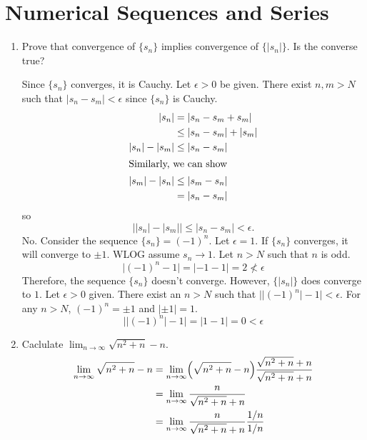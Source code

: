 \chapter{Numerical Sequences and Series}

\begin{enumerate}
\item
  Prove that convergence of \(\{s_n\}\) implies convergence of
  \(\{\lvert s_n\rvert\}\).
  Is the converse true?
  \par\smallskip
  Since \(\{s_n\}\) converges, it is Cauchy.
  Let \(\epsilon > 0\) be given.
  There exist \(n,m > N\) such that \(\lvert s_n - s_m\rvert < \epsilon\) since
  \(\{s_n\}\) is Cauchy.
  \begin{align*}
    \lvert s_n\rvert & = \lvert s_n - s_m + s_m\rvert\\
                     & \leq \lvert s_n - s_m\rvert + \lvert s_m\rvert\\
    \lvert s_n\rvert - \lvert s_m\rvert & \leq \lvert s_n - s_m\rvert\\
    \intertext{Similarly, we can show}
    \lvert s_m\rvert - \lvert s_n\rvert & \leq \lvert s_m - s_n\rvert\\
                     & = \lvert s_n - s_m\rvert
  \end{align*}
  so
  \[
  \bigl\lvert\lvert s_n\rvert - \lvert s_m\rvert\bigr\rvert\leq
  \lvert s_n - s_m\rvert < \epsilon.
  \]
  No.
  Consider the sequence \(\{s_n\} = (-1)^n\).
  Let \(\epsilon = 1\).
  If \(\{s_n\}\) converges, it will converge to \(\pm 1\).
  WLOG assume \(s_n\to 1\).
  Let \(n > N\) such that \(n\) is odd.
  \[
  \lvert (-1)^n - 1\rvert = \lvert -1 - 1\rvert = 2\not < \epsilon
  \]
  Therefore, the sequence \(\{s_n\}\) doesn't converge.
  However, \(\{\lvert s_n\rvert\}\) does converge to \(1\).
  Let \(\epsilon > 0\) given.
  There exist an \(n > N\) such that
  \(\bigl\lvert\lvert (-1)^n\rvert - 1\bigr\rvert < \epsilon\).
  For any \(n > N\), \((-1)^n = \pm 1\) and \(\lvert \pm 1\rvert = 1\).
  \[
  \bigl\lvert\lvert (-1)^n\rvert - 1\bigr\rvert =
  \lvert 1 - 1\rvert = 0 < \epsilon
  \]
\item
  Caclulate \(\lim_{n\to\infty}\sqrt{n^2 + n} - n\).
  \begin{align*}
    \lim_{n\to\infty}\sqrt{n^2 + n} - n
    & = \lim_{n\to\infty}\Bigl(\sqrt{n^2 + n} - n\Bigr)
      \frac{\sqrt{n^2 + n} + n}{\sqrt{n^2 + n} + n}\\
    & = \lim_{n\to\infty}\frac{n}{\sqrt{n^2 + n} + n}\\
    & = \lim_{n\to\infty}\frac{n}{\sqrt{n^2 + n} + n}\frac{1/n}{1/n}\\

\end{align*}
\end{enumerate}
